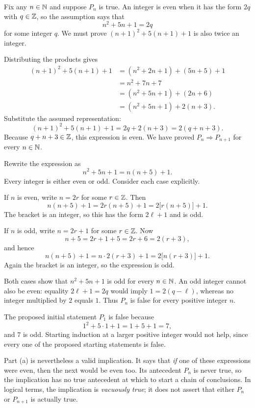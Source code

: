 Fix any $n\in\mathbb{N}$ and suppose $P_n$ is true. An integer is even when
it has the form $2q$ with $q\in\mathbb{Z}$, so the assumption says that
\[
 n^2+5n+1=2q
\]
for some integer $q$. We must prove $(n+1)^2+5(n+1)+1$ is also twice
an integer.

Distributing the products gives
\begin{align*}
 (n+1)^2+5(n+1)+1
 &=(n^2+2n+1)+(5n+5)+1\\
 &=n^2+7n+7\\
 &=(n^2+5n+1)+(2n+6)\\
 &=(n^2+5n+1)+2(n+3).
\end{align*}
Substitute the assumed representation:
\[
 (n+1)^2+5(n+1)+1
 =2q+2(n+3)=2(q+n+3).
\]
Because $q+n+3\in\mathbb{Z}$, this expression is even. We have proved
$P_n\Rightarrow P_{n+1}$ for every $n\in\mathbb{N}$.

Rewrite the expression as
\[
 n^2+5n+1=n(n+5)+1.
\]
Every integer is either even or odd. Consider each case explicitly.

If $n$ is even, write $n=2r$ for some $r\in\mathbb{Z}$. Then
\[
 n(n+5)+1=2r(n+5)+1=2\bigl[r(n+5)\bigr]+1.
\]
The bracket is an integer, so this has the form $2\ell+1$ and is odd.

If $n$ is odd, write $n=2r+1$ for some $r\in\mathbb{Z}$. Now
\[
 n+5=2r+1+5=2r+6=2(r+3),
\]
and hence
\[
 n(n+5)+1=n\cdot2(r+3)+1=2\bigl[n(r+3)\bigr]+1.
\]
Again the bracket is an integer, so the expression is odd.

Both cases show that $n^2+5n+1$ is odd for every $n\in\mathbb{N}$.
An odd integer cannot also be even: equality $2\ell+1=2q$ would imply
$1=2(q-\ell)$, whereas no integer multiplied by $2$ equals $1$.
Thus $P_n$ is false for every positive integer $n$.

The proposed initial statement $P_1$ is false because
\[
 1^2+5\cdot1+1=1+5+1=7,
\]
and $7$ is odd. Starting induction at a larger positive integer would
not help, since every one of the proposed starting statements is false.

Part (a) is nevertheless a valid implication. It says that \emph{if}
one of these expressions were even, then the next would be even too.
Its antecedent $P_n$ is never true, so the implication has no true
antecedent at which to start a chain of conclusions. In logical terms,
the implication is \emph{vacuously true}; it does not assert that either
$P_n$ or $P_{n+1}$ is actually true.

